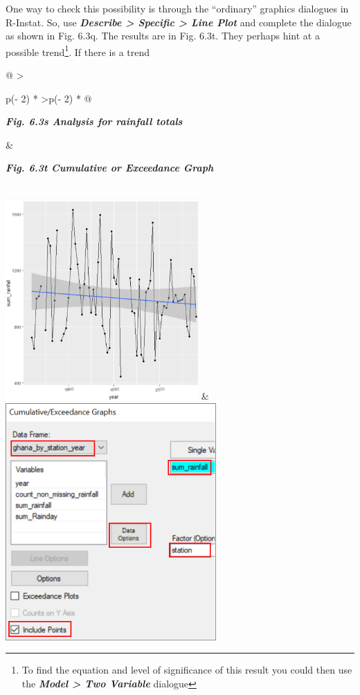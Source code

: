 \documentclass[
  letterpaper,
  DIV=11,
  numbers=noendperiod]{scrreprt}
\begin{document}
One way to check this possibility is through the ``ordinary'' graphics
dialogues in R-Instat. So, use \textbf{\emph{Describe \textgreater{}
Specific \textgreater{} Line Plot}} and complete the dialogue as shown
in Fig. 6.3q. The results are in Fig. 6.3t. They perhaps hint at a
possible trend\footnote{To find the equation and level of significance
  of this result you could then use the \textbf{\emph{Model
  \textgreater{} Two Variable}} dialogue}. If there is a trend

\begin{longtable}[]{@{}
  >{\raggedright\arraybackslash}p{(\columnwidth - 2\tabcolsep) * }
  >{\raggedleft\arraybackslash}p{(\columnwidth - 2\tabcolsep) * }@{}}
\toprule\noalign{}
\begin{minipage}[b]{\linewidth}\raggedright
\textbf{\emph{Fig. 6.3s Analysis for rainfall totals}}
\end{minipage} & \begin{minipage}[b]{\linewidth}\raggedleft
\textbf{\emph{Fig. 6.3t Cumulative or Exceedance Graph}}
\end{minipage} \\
\midrule\noalign{}
\endhead
\bottomrule\noalign{}
\endlastfoot
\includegraphics[width=2.89721in,height=3.03582in]{figures/Fig6.3s.png}
&
\includegraphics[width=3.16711in,height=3.57535in]{figures/Fig6.3t.png} \\
\end{longtable}
\end{document}

